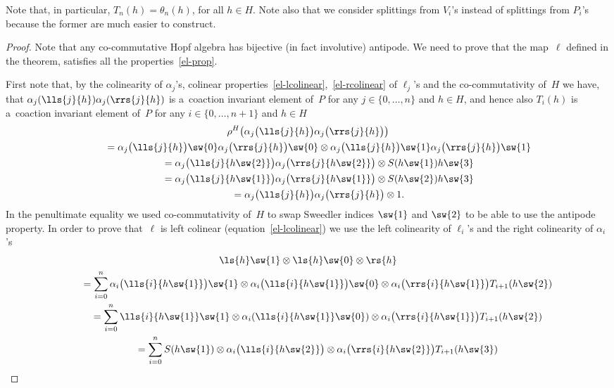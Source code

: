 Note that, in particular, $T_n(h)=\theta_n(h)$, for all $h\in H$.
Note also that we consider splittings from $V_i$'s instead of splittings from $P_i$'s because the former are much easier
to construct.
\begin{proof}
Note that any co-commutative Hopf algebra has bijective (in fact involutive) antipode.
We need to prove that the map~$\ell$ def\/ined in the theorem, satisf\/ies all the properties~\eqref{el-prop}.

First note that, by the colinearity of $\alpha_j$'s, colinear properties~\eqref{el-lcolinear},~\eqref{el-rcolinear} of
$\ell_j$'s and the co-commutativity of~$H$ we have, that $\alpha_j(\lls{j}{h})\alpha_{j}(\rrs{j}{h})$ is a~coaction
invariant element of~$P$ for any $j\in\{0,\ldots,n\}$ and $h\in H$, and hence also $T_i(h)$ is a~coaction invariant
element of~$P$ for any $i\in\{0,\ldots,n+1\}$ and $h\in H$
\begin{gather*}
\rho^H\big(\alpha_j\big(\lls{j}{h}\big)\alpha_{j}\big(\rrs{j}{h}\big)\big)\\
\qquad{}
=\alpha_j\big(\lls{j}{h}\big)\sw{0}\alpha_{j}\big(\rrs{j}{h}\big)\sw{0} \otimes
\alpha_j\big(\lls{j}{h}\big)\sw{1}\alpha_{j}\big(\rrs{j}{h}\big)\sw{1}
\\
\qquad{}
 =\alpha_j\big(\lls{j}{h\sw{2}}\big)\alpha_{j}\big(\rrs{j}{h\sw{2}}\big)\otimes S(h\sw{1})h\sw{3}
\\
\qquad{}
 =\alpha_j\big(\lls{j}{h\sw{1}}\big)\alpha_{j}\big(\rrs{j}{h\sw{1}}\big)\otimes S(h\sw{2})h\sw{3}\\
 \qquad{}
 =\alpha_j\big(\lls{j}{h}\big)\alpha_{j}\big(\rrs{j}{h}\big)\otimes1.
\end{gather*}
In the penultimate equality we used co-commutativity of~$H$ to swap Sweedler indices $\sw{1}$ and $\sw{2}$ to be able to
use the antipode property.
In order to prove that~$\ell$ is left colinear (equation~\eqref{el-lcolinear}) we use the left colinearity of $\ell_i$'s
and the right colinearity of $\alpha_i$'s
\begin{gather*}
\ls{h}\sw{1}\otimes\ls{h}\sw{0}\otimes\rs{h}
\\
\qquad=
\sum\limits_{i=0}^n\alpha_i\big(\lls{i}{h\sw{1}}\big)\sw{1}\otimes\alpha_i\big(\lls{i}{h\sw{1}}\big)\sw{0}
\otimes\alpha_i\big(\rrs{i}{h\sw{1}}\big)T_{i+1}(h\sw{2})
\\
\qquad=
\sum\limits_{i=0}^n\lls{i}{h\sw{1}}\sw{1}\otimes\alpha_i(\lls{i}{h\sw{1}}\sw{0})
\otimes\alpha_i\big(\rrs{i}{h\sw{1}}\big)T_{i+1}(h\sw{2})
\\
\qquad=
\sum\limits_{i=0}^nS(h\sw{1})\otimes\alpha_i\big(\lls{i}{h\sw{2}}\big) \otimes\alpha_i\big(\rrs{i}{h\sw{2}}\big)T_{i+1}(h\sw{3})

\end{gather*}
\end{proof}
